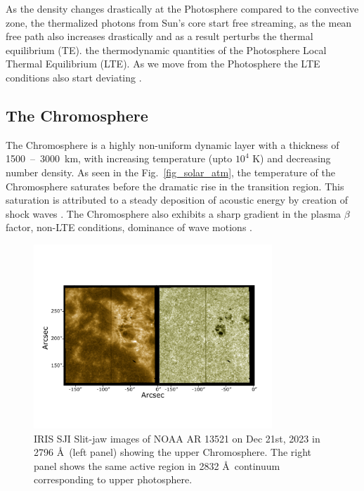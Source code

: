 As the density changes drastically at the Photosphere compared to the convective zone, the thermalized photons from Sun's core start free streaming, as the mean free path also increases drastically and as a result perturbs the thermal equilibrium (TE).  the thermodynamic quantities of the Photosphere  Local Thermal Equilibrium (LTE). As we move  from the Photosphere the LTE conditions also start deviating  \citep{philips08}.

\subsection{The Chromosphere}\label{chromosphere}

The Chromosphere is a highly non-uniform dynamic layer with a thickness of 1500~--~3000~km, with increasing temperature (upto $10^{4}$ K) and decreasing number density. As seen in the Fig.~\ref{fig_solar_atm}, the temperature of the Chromosphere saturates before the dramatic rise in the transition region. This saturation is attributed to a steady deposition of acoustic energy by creation of shock waves \citep{carlsson07}. The Chromosphere also exhibits a sharp gradient in the plasma $\beta$ factor, non-LTE conditions, dominance of wave motions . 

\begin{figure}[ht!]
    \centering
    \includegraphics[trim={1cm 3cm 2cm 5cm},clip,width=0.8\textwidth]{Figures/sji_images.pdf}
    \caption{IRIS SJI Slit-jaw images of NOAA AR 13521 on Dec 21st, 2023 in  2796 {\AA}~(left panel) showing the upper Chromosphere. The right panel shows the same active region in 2832 {\AA}~continuum corresponding to upper photosphere.}
    \label{fig:sji_features}
\end{figure}

